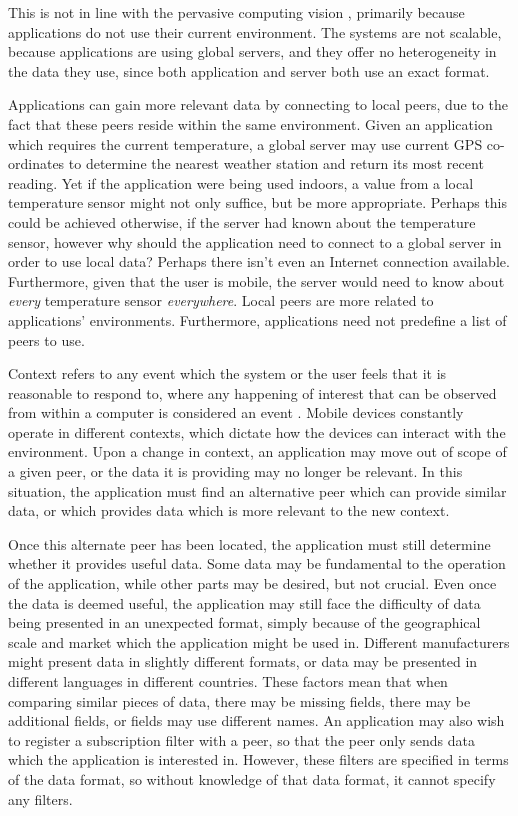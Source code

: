 \documentclass[12pt,twoside,notitlepage]{report}
\begin{document}
This is not in line with the pervasive computing vision \cite{weiser1991computer}, primarily because applications do not use their current environment. 
The systems are not scalable, because applications are using global servers, and they offer no heterogeneity\cite{saha2003pervasive} in the data they use, since both application and server both use an exact format.

Applications can gain more relevant data by connecting to local peers, due to the fact that these peers reside within the same environment.
Given an application which requires the current temperature, a global server may use current GPS co-ordinates to determine the nearest weather station and return its most recent reading. 
Yet if the application were being used indoors, a value from a local temperature sensor might not only suffice, but be more appropriate. 
Perhaps this could be achieved otherwise, if the server had known about the temperature sensor, however why should the application need to connect to a global server in order to use local data? Perhaps there isn't even an Internet connection available. 
Furthermore, given that the user is mobile, the server would need to know about {\sl every} temperature sensor {\sl everywhere}. 
Local peers are more related to applications' environments. 
Furthermore, applications need not predefine a list of peers to use.

Context refers to any event which the system or the user feels that it is reasonable to respond to, where any happening of interest that can be observed from within a computer is considered an event \cite[p11]{muhl2006distributed}. 
Mobile devices constantly operate in different contexts, which dictate how the devices can interact with the environment. 
Upon a change in context, an application may move out of scope of a given peer, or the data it is providing may no longer be relevant. 
In this situation, the application must find an alternative peer which can provide similar data, or which provides data which is more relevant to the new context. 

Once this alternate peer has been located, the application must still determine whether it provides useful data. 
Some data may be fundamental to the operation of the application, while other parts may be desired, but not crucial.  
Even once the data is deemed useful, the application may still face the difficulty of data being presented in an unexpected format, simply because of the geographical scale and market which the application might be used in. 
Different manufacturers might present data in slightly different formats, or data may be presented in different languages in different countries. 
These factors mean that when comparing similar pieces of data, there may be missing fields, there may be additional fields, or fields may use different names. 
An application may also wish to register a subscription filter with a peer, so that the peer only sends data which the application is interested in. 
However, these filters are specified in terms of the data format, so without knowledge of that data format, it cannot specify any filters.
\end{document}
